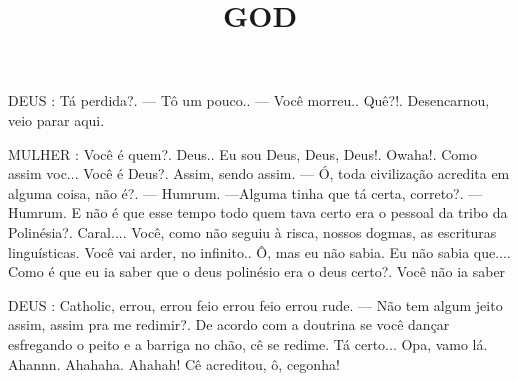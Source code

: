 \documentclass[10pt]{article}
\author{}
\title{\vspace{-3.5cm}GOD}
\date{}
\newcommand{\mychar}[1]{
  \bigskip
  \hspace{-2em} \MakeUppercase{#1}
}
\begin{document}
\maketitle



\mychar{DEUS}: Tá perdida?. — Tô um pouco.. — Você morreu.. Quê?!. Desencarnou, veio parar aqui.

\mychar{MULHER}: Você é quem?. Deus.. Eu sou Deus, Deus, Deus!. Owaha!. Como assim voc... Você é Deus?. Assim, sendo assim. — Ó, toda civilização acredita em alguma coisa, não é?. — Humrum. —Alguma tinha que tá certa, correto?. — Humrum. E não é que esse tempo todo quem tava certo era o pessoal da tribo da Polinésia?. Caral.... Você, como não seguiu à risca, nossos dogmas, as escrituras linguísticas. Você vai arder, no infinito.. Ô, mas eu não sabia. Eu não sabia que.... Como é que eu ia saber que o deus polinésio era o deus certo?. Você não ia saber

\mychar{DEUS}: Catholic, errou, errou feio errou feio errou rude. — Não tem algum jeito assim, assim pra me redimir?. De acordo com a doutrina se você dançar esfregando  o peito e a barriga no chão, cê se redime. Tá certo... Opa, vamo lá. Ahannn. Ahahaha. Ahahah! Cê acreditou, ô, cegonha!
\end{document}
